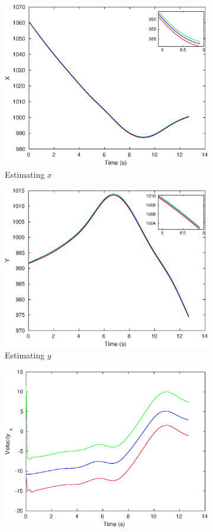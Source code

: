 \begin{figure}
\begin{subfigure}{.5\textwidth}
\centering
\includegraphics[width=.8\linewidth]{figures/s_caXzoomed}
\caption{Estimating $x$}
\end{subfigure}
\begin{subfigure}{.5\textwidth}
\centering
\includegraphics[width=.8\linewidth]{figures/s_caYzoomed}
\caption{Estimating $y$}
\end{subfigure}
\begin{subfigure}{.5\textwidth}
\centering
\includegraphics[width=.8\linewidth]{figures/s_caVelocity_x}

\end{subfigure}
\end{figure}
